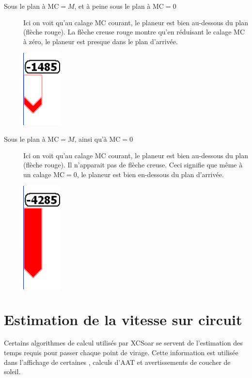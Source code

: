 \begin{description}
\item[Sous le plan à MC$=M$, et à peine sous le plan à MC$=0$]
  Ici on voit qu'au calage MC courant, le planeur est bien au-dessous du plan (flèche rouge). La flèche creuse rouge montre qu'en réduisant le calage MC à zéro, le planeur est presque dans le plan d'arrivée.
\begin{center}
\includegraphics[angle=0,width=2cm,keepaspectratio='true']{figures/fig-finalglide-littlebelow.png}
\end{center}

\item[Sous le plan à MC$=M$, ainsi qu'à  MC$=0$]
  Ici on voit qu'au calage MC courant, le planeur est bien au-dessous du plan (flèche rouge). Il n'apparait pas de flèche creuse. Ceci signifie que même à un calage MC$=0$, le planeur est bien en-dessous du plan d'arrivée.
\begin{center}
\includegraphics[angle=0,width=2cm,keepaspectratio='true']{figures/fig-finalglide-allbelow.png}
\end{center}
\end{description}
 

\section{Estimation de la vitesse sur circuit}\label{sec:task-speed-estim}

Certains algorithmes de calcul utilisés par XCSoar se servent de l'estimation des temps requis pour passer chaque point de virage. Cette information est utilisée dans l'affichage de certaines {\InfoBox}, calculs d'AAT et avertissements de coucher de soleil. 

